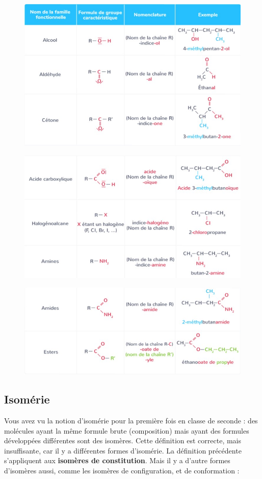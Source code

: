 \documentclass[11pt,a4paper]{article}
\begin{document}
\begin{figure}[H]
    \centering
    \includegraphics[width=0.85\linewidth]{imgs/c5/groupes1.jpg}
\end{figure}
\begin{figure}[H]
    \centering
    \includegraphics[width=0.85\linewidth]{imgs/c5/groupes2.jpg}
\end{figure}
\begin{figure}[H]
    \centering
    \includegraphics[width=0.85\linewidth]{imgs/c5/groupes3.jpg}
\end{figure}


\subsection{Isomérie}
Vous avez vu la notion d'isomérie pour la première fois en classe de seconde : des molécules ayant la même formule brute (composition) mais ayant des formules développées différentes sont des isomères. Cette définition est correcte, mais insuffisante, car il y a différentes formes d'isomérie. La définition précédente s'appliquent aux \textbf{isomères de constitution}. Mais il y a d'autre formes d'isomères aussi, comme les isomères de configuration, et de conformation : 
\end{document}
